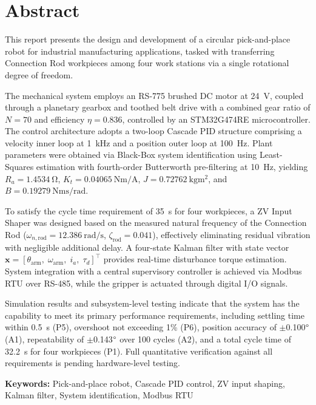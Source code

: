 \newpage

\chapter*{Abstract}

This report presents the design and development of a circular pick-and-place robot
for industrial manufacturing applications, tasked with transferring Connection Rod
workpieces among four work stations via a single rotational degree of freedom.

The mechanical system employs an RS-775 brushed DC motor at 24~V,
coupled through a planetary gearbox and toothed belt drive with a combined gear ratio
of $N = 70$ and efficiency $\eta = 0.836$, controlled by an STM32G474RE microcontroller.
The control architecture adopts a two-loop Cascade PID structure comprising
a velocity inner loop at 1~kHz and a position outer loop at 100~Hz.
Plant parameters were obtained via Black-Box system identification using Least-Squares estimation
with fourth-order Butterworth pre-filtering at 10~Hz, yielding
$R_a = \SI{1.4534}{\ohm}$, $K_t = \SI{0.04065}{\newton\metre\per\ampere}$,
$J = \SI{0.72762}{\kilogram\metre\squared}$, and $B = \SI{0.19279}{\newton\metre\second\per\radian}$.

To satisfy the cycle time requirement of 35~s for four workpieces,
a ZV Input Shaper was designed based on the measured natural frequency of the Connection Rod
($\omega_{n,\mathrm{rod}} = \SI{12.386}{\radian\per\second}$, $\zeta_\mathrm{rod} = 0.041$),
effectively eliminating residual vibration with negligible additional delay.
A four-state Kalman filter with state vector
$\mathbf{x} = [\theta_\mathrm{arm},\; \omega_\mathrm{arm},\; i_a,\; \tau_d]^\top$
provides real-time disturbance torque estimation.
System integration with a central supervisory controller is achieved via
Modbus RTU over RS-485, while the gripper is actuated through digital I/O signals.

Simulation results and subsystem-level testing indicate that the system has the capability
to meet its primary performance requirements,
including settling time within 0.5~s (P5), overshoot not exceeding 1\% (P6),
position accuracy of $\pm$0.100$\degree$ (A1),
repeatability of $\pm$0.143$\degree$ over 100 cycles (A2),
and a total cycle time of 32.2~s for four workpieces (P1).
Full quantitative verification against all requirements is pending hardware-level testing.

\vspace{1.2cm}
\noindent\textbf{Keywords:}
Pick-and-place robot,
Cascade PID control,
ZV input shaping,
Kalman filter,
System identification,
Modbus RTU
